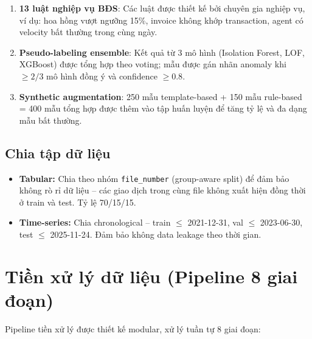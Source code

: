 \begin{enumerate}
  \item \textbf{13 luật nghiệp vụ BĐS}: Các luật được thiết kế bởi chuyên gia nghiệp vụ, ví dụ: hoa hồng vượt ngưỡng 15\%, invoice không khớp transaction, agent có velocity bất thường trong cùng ngày.

  \item \textbf{Pseudo-labeling ensemble}: Kết quả từ 3 mô hình (Isolation Forest, LOF, XGBoost) được tổng hợp theo voting; mẫu được gán nhãn anomaly khi $\geq 2/3$ mô hình đồng ý và confidence $\geq 0.8$.

  \item \textbf{Synthetic augmentation}: 250 mẫu template-based + 150 mẫu rule-based = 400 mẫu tổng hợp được thêm vào tập huấn luyện để tăng tỷ lệ và đa dạng mẫu bất thường.
\end{enumerate}

\subsection{Chia tập dữ liệu}

\begin{itemize}
  \item \textbf{Tabular:} Chia theo nhóm \texttt{file\_number} (group-aware split) để đảm bảo không rò rỉ dữ liệu -- các giao dịch trong cùng file không xuất hiện đồng thời ở train và test. Tỷ lệ 70/15/15.
  \item \textbf{Time-series:} Chia chronological -- train $\leq$ 2021-12-31, val $\leq$ 2023-06-30, test $\leq$ 2025-11-24. Đảm bảo không data leakage theo thời gian.
\end{itemize}

\section{Tiền xử lý dữ liệu (Pipeline 8 giai đoạn)}

Pipeline tiền xử lý được thiết kế modular, xử lý tuần tự 8 giai đoạn:

